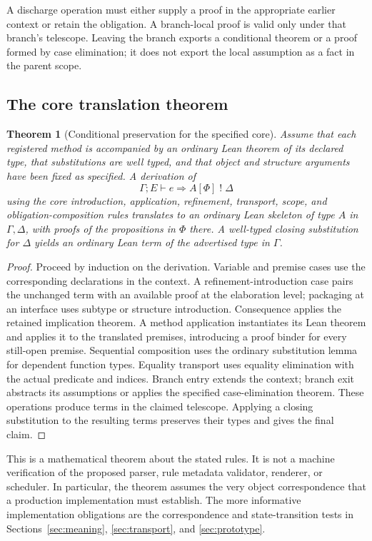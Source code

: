 \documentclass[11pt,a4paper]{article}
\newtheorem{theorem}{Theorem}[section]
\theoremstyle{definition}
\theoremstyle{remark}
\begin{document}
A discharge operation must either supply a proof in the appropriate earlier
context or retain the obligation. A branch-local proof is valid only under
that branch's telescope. Leaving the branch exports a conditional theorem or
a proof formed by case elimination; it does not export the local assumption
as a fact in the parent scope.

\subsection{The core translation theorem}

\begin{theorem}[Conditional preservation for the specified core]\label{thm:preservation}
Assume that each registered method is accompanied by an ordinary Lean theorem
of its declared type, that substitutions are well typed, and that object and
structure arguments have been fixed as specified. A derivation of
\[
 \Gamma;E\vdash e\Rightarrow A[\Phi]\;!\;\Delta
\]
using the core introduction, application, refinement, transport, scope, and
obligation-composition rules translates to an ordinary Lean skeleton of type
$A$ in $\Gamma,\Delta$, with proofs of the propositions in $\Phi$ there.
A well-typed closing substitution for $\Delta$ yields an ordinary Lean term
of the advertised type in $\Gamma$.
\end{theorem}

\begin{proof}
Proceed by induction on the derivation. Variable and premise cases use the
corresponding declarations in the context. A refinement-introduction case
pairs the unchanged term with an available proof at the elaboration level;
packaging at an interface uses subtype or structure introduction. Consequence
applies the retained implication theorem. A method application instantiates
its Lean theorem and applies it to the translated premises, introducing a
proof binder for every still-open premise. Sequential composition uses the
ordinary substitution lemma for dependent function types. Equality transport
uses equality elimination with the actual predicate and indices. Branch entry
extends the context; branch exit abstracts its assumptions or applies the
specified case-elimination theorem. These operations produce terms in the
claimed telescope. Applying a closing substitution to the resulting terms
preserves their types and gives the final claim.
\end{proof}

This is a mathematical theorem about the stated rules. It is not a machine
verification of the proposed parser, rule metadata validator, renderer, or
scheduler. In particular, the theorem assumes the very object correspondence
that a production implementation must establish. The more informative
implementation obligations are the correspondence and state-transition tests
in Sections~\ref{sec:meaning}, \ref{sec:transport}, and \ref{sec:prototype}.
\end{document}
